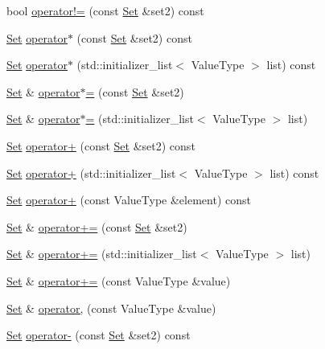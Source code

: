 \begin{DoxyCompactItemize}
\item 
bool \mbox{\hyperlink{classSet_aca651f75c11c3e2f6fe86784ef6328bb}{operator!=}} (const \mbox{\hyperlink{classSet}{Set}} \&set2) const
\item 
\mbox{\hyperlink{classSet}{Set}} \mbox{\hyperlink{classSet_a689fa2c04fa384b9637e96de2f93f7c1}{operator$\ast$}} (const \mbox{\hyperlink{classSet}{Set}} \&set2) const
\item 
\mbox{\hyperlink{classSet}{Set}} \mbox{\hyperlink{classSet_ad904c8a1b9df49aa6c314d20f8f58514}{operator$\ast$}} (std\+::initializer\+\_\+list$<$ Value\+Type $>$ list) const
\item 
\mbox{\hyperlink{classSet}{Set}} \& \mbox{\hyperlink{classSet_a6bb863fdd7ae3e4cab2a9b1af7f9bfdb}{operator$\ast$=}} (const \mbox{\hyperlink{classSet}{Set}} \&set2)
\item 
\mbox{\hyperlink{classSet}{Set}} \& \mbox{\hyperlink{classSet_a00b5068e2a5ac025f0b007b152923e86}{operator$\ast$=}} (std\+::initializer\+\_\+list$<$ Value\+Type $>$ list)
\item 
\mbox{\hyperlink{classSet}{Set}} \mbox{\hyperlink{classSet_a8cbf144940ec09832d9bcb053f346933}{operator+}} (const \mbox{\hyperlink{classSet}{Set}} \&set2) const
\item 
\mbox{\hyperlink{classSet}{Set}} \mbox{\hyperlink{classSet_a34b4a7f2f0e163e185c1b2a0bb40d7d8}{operator+}} (std\+::initializer\+\_\+list$<$ Value\+Type $>$ list) const
\item 
\mbox{\hyperlink{classSet}{Set}} \mbox{\hyperlink{classSet_a057e75a7d4b8ff9453c0a91b652c7f71}{operator+}} (const Value\+Type \&element) const
\item 
\mbox{\hyperlink{classSet}{Set}} \& \mbox{\hyperlink{classSet_ab6102e55e47e512960c6e1a075399c0d}{operator+=}} (const \mbox{\hyperlink{classSet}{Set}} \&set2)
\item 
\mbox{\hyperlink{classSet}{Set}} \& \mbox{\hyperlink{classSet_a360b68eb88d08e6a51a4c78a6c6cef2f}{operator+=}} (std\+::initializer\+\_\+list$<$ Value\+Type $>$ list)
\item 
\mbox{\hyperlink{classSet}{Set}} \& \mbox{\hyperlink{classSet_aa48c02af8af47699d2eb4306b10c44d1}{operator+=}} (const Value\+Type \&value)
\item 
\mbox{\hyperlink{classSet}{Set}} \& \mbox{\hyperlink{classSet_a3d81d8a5397c6fe2c6eb5fc1a4029922}{operator,}} (const Value\+Type \&value)
\item 
\mbox{\hyperlink{classSet}{Set}} \mbox{\hyperlink{classSet_a43f16ff49c06f1b5c005d7da94438613}{operator-\/}} (const \mbox{\hyperlink{classSet}{Set}} \&set2) const

\end{DoxyCompactItemize}
